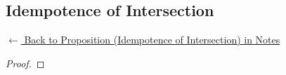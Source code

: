 
\subsection*{Idempotence of Intersection}
\label{prf:idempotence-intersection}

\begin{remark*}[Return]
\hyperref[prop:idempotence-intersection]{$\leftarrow$ Back to Proposition (Idempotence of Intersection) in Notes}
\end{remark*}

\begin{proof}
\end{proof}

\begin{remark*}

\end{remark*}

\begin{remark*}[Dependencies]

\FlashUses{}
\end{remark*}
